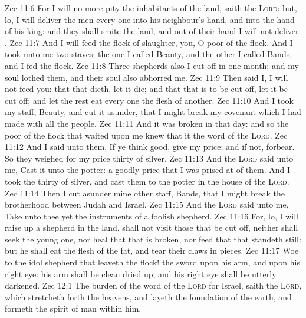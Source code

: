\vs Zec 11:6 For I will no more pity the inhabitants of the land, saith the \textsc{Lord}: but, lo, I will deliver the men every one into his neighbour's hand, and into the hand of his king: and they shall smite the land, and out of their hand I will not deliver .
\vs Zec 11:7 And I will feed the flock of slaughter,  you, O poor of the flock. And I took unto me two staves; the one I called Beauty, and the other I called Bands; and I fed the flock.
\vs Zec 11:8 Three shepherds also I cut off in one month; and my soul lothed them, and their soul also abhorred me.
\vs Zec 11:9 Then said I, I will not feed you: that that dieth, let it die; and that that is to be cut off, let it be cut off; and let the rest eat every one the flesh of another.
\vs Zec 11:10 And I took my staff,  Beauty, and cut it asunder, that I might break my covenant which I had made with all the people.
\vs Zec 11:11 And it was broken in that day: and so the poor of the flock that waited upon me knew that it  the word of the \textsc{Lord}.
\vs Zec 11:12 And I said unto them, If ye think good, give  my price; and if not, forbear. So they weighed for my price thirty  of silver.
\vs Zec 11:13 And the \textsc{Lord} said unto me, Cast it unto the potter: a goodly price that I was prised at of them. And I took the thirty  of silver, and cast them to the potter in the house of the \textsc{Lord}.
\vs Zec 11:14 Then I cut asunder mine other staff,  Bands, that I might break the brotherhood between Judah and Israel.
\vs Zec 11:15 And the \textsc{Lord} said unto me, Take unto thee yet the instruments of a foolish shepherd.
\vs Zec 11:16 For, lo, I will raise up a shepherd in the land,  shall not visit those that be cut off, neither shall seek the young one, nor heal that that is broken, nor feed that that standeth still: but he shall eat the flesh of the fat, and tear their claws in pieces.
\vs Zec 11:17 Woe to the idol shepherd that leaveth the flock! the sword  upon his arm, and upon his right eye: his arm shall be clean dried up, and his right eye shall be utterly darkened.
\vs Zec 12:1 The burden of the word of the \textsc{Lord} for Israel, saith the \textsc{Lord}, which stretcheth forth the heavens, and layeth the foundation of the earth, and formeth the spirit of man within him.

